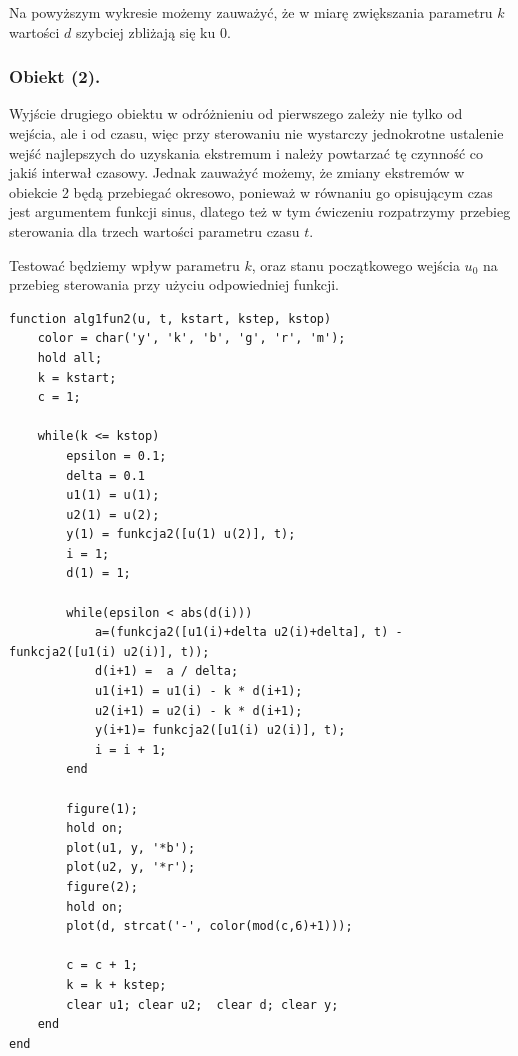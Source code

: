 \documentclass[a4paper,10pt]{article}
\begin{document}
Na powyższym wykresie możemy zauważyć, że w miarę zwiększania parametru $k$ wartości $d$ szybciej zbliżają się ku $0$.

\newpage
\subsubsection{Obiekt (2).}

Wyjście drugiego obiektu w odróżnieniu od pierwszego zależy nie tylko od wejścia, ale i od czasu, więc przy sterowaniu nie wystarczy jednokrotne ustalenie wejść najlepszych do uzyskania ekstremum i należy powtarzać tę czynność co jakiś interwał czasowy. Jednak zauważyć możemy, że zmiany ekstremów w obiekcie 2 będą przebiegać okresowo, ponieważ w równaniu go opisującym czas jest argumentem funkcji sinus, dlatego też w tym ćwiczeniu rozpatrzymy przebieg sterowania dla trzech wartości parametru czasu $t$.

Testować będziemy wpływ parametru $k$, oraz stanu początkowego wejścia $u_0$ na przebieg sterowania przy użyciu odpowiedniej funkcji.
\begin{lstlisting}[caption=Funkcja testująca algorytm 1 dla obiektu 2.]
function alg1fun2(u, t, kstart, kstep, kstop)
    color = char('y', 'k', 'b', 'g', 'r', 'm');
    hold all;
    k = kstart;
    c = 1;
    
    while(k <= kstop)
        epsilon = 0.1;
        delta = 0.1
        u1(1) = u(1);
        u2(1) = u(2);
        y(1) = funkcja2([u(1) u(2)], t);
        i = 1;
        d(1) = 1;
        
        while(epsilon < abs(d(i)))
            a=(funkcja2([u1(i)+delta u2(i)+delta], t) - funkcja2([u1(i) u2(i)], t));
            d(i+1) =  a / delta;
            u1(i+1) = u1(i) - k * d(i+1);
            u2(i+1) = u2(i) - k * d(i+1);
            y(i+1)= funkcja2([u1(i) u2(i)], t);
            i = i + 1;
        end

        figure(1);
        hold on;
        plot(u1, y, '*b');
        plot(u2, y, '*r');
        figure(2);
        hold on;
        plot(d, strcat('-', color(mod(c,6)+1)));
       
        c = c + 1;
        k = k + kstep;
        clear u1; clear u2;  clear d; clear y;
    end
end
\end{lstlisting}
\end{document}
